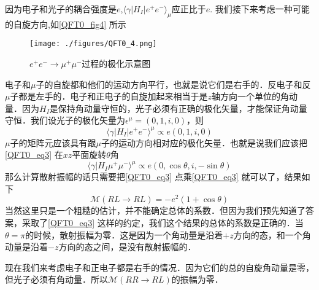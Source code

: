 因为电子和光子的耦合强度是$e$,$\langle \gamma | H_I | e^+ e^- \rangle_\mu$应正比于$e$. 我们接下来考虑一种可能的自旋方向,如\autoref{QFT0_fig4} 所示
\begin{figure}[ht]
\centering
\texttt{[image: ./figures/QFT0\_4.png]}
\caption{$e^+e^-\rightarrow\mu^+\mu^-$过程的极化示意图} \label{QFT0_fig4}
\end{figure}
电子和$\mu$子的自旋都和他们的运动方向平行，也就是说它们是右手的．反电子和反$\mu$子都是左手的．电子和正电子的自旋加起来相当于是$z$轴方向一个单位的角动量．因为$H_I$是保持角动量守恒的，光子必须有正确的极化矢量，才能保证角动量守恒．我们设光子的极化矢量为$\epsilon^\mu =(0,1,i,0)$，则
\begin{equation}
\langle \gamma | H_I | e^+ e^- \rangle^\mu \propto e (0,1,i ,0)
\end{equation}
$\mu$子的矩阵元应该具有跟$\mu$子的运动方向相对应的极化矢量．也就是说我们应该把\autoref{QFT0_eq3} 在$xz$平面旋转$\theta$角
\begin{equation}
\langle \gamma| H_I \mu^+\mu^-\rangle^\mu \propto e (0,\cos\theta, i, - \sin\theta) 
\end{equation}
那么计算散射振幅的话只需要把\autoref{QFT0_eq3} 点乘\autoref{QFT0_eq3} 就可以了，结果如下
\begin{equation}
\mathcal M(RL\rightarrow RL) = - e^2 (1+\cos\theta)
\end{equation}
当然这里只是一个粗糙的估计，并不能确定总体的系数．但因为我们预先知道了答案，采取了\autoref{QFT0_eq3} 这样的约定，我们这个结果的总体的系数是正确的．当$\theta = \pi$的时候，散射振幅为零．这是因为一个角动量是沿着$+z$方向的态，和一个角动量是沿着$-z$方向的态之间，是没有散射振幅的．

现在我们来考虑电子和正电子都是右手的情况．因为它们的总的自旋角动量是零，但光子必须有角动量．所以$\mathcal M (RR \rightarrow RL)$的振幅为零．

























